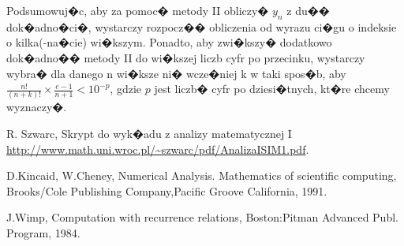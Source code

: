 \documentclass[12pt,wide]{mwart}
\begin{document}
Podsumowuj�c, aby za pomoc� metody II obliczy� $y_n$ z du�� dok�adno�ci�, wystarczy rozpocz�� obliczenia od wyrazu ci�gu o indeksie o kilka(-na�cie) wi�kszym. Ponadto, aby zwi�kszy� dodatkowo dok�adno�� metody II do wi�kszej liczb cyfr po przecinku, wystarczy wybra� dla danego n wi�ksze ni� wcze�niej k w taki spos�b, aby $\frac{n!}{(n+k)!} \times \frac{e-1}{n+1} < 10^{-p}$, gdzie $p$ jest liczb� cyfr po dziesi�tnych, kt�re chcemy wyznaczy�.




\begin{thebibliography}{9}
\itemsep2pt
 R. Szwarc, Skrypt do wyk�adu z analizy matematycznej I
             \url{http://www.math.uni.wroc.pl/~szwarc/pdf/AnalizaISIM1.pdf}.
             
						
 D.Kincaid, W.Cheney, Numerical Analysis. Mathematics of scientific computing,
							Brooks/Cole Publishing Company,Pacific Groove California, 1991.
							
 J.Wimp, Computation with recurrence relations, 
							Boston:Pitman Advanced Publ. Program, 1984.
							
\end{thebibliography}
\end{document}
